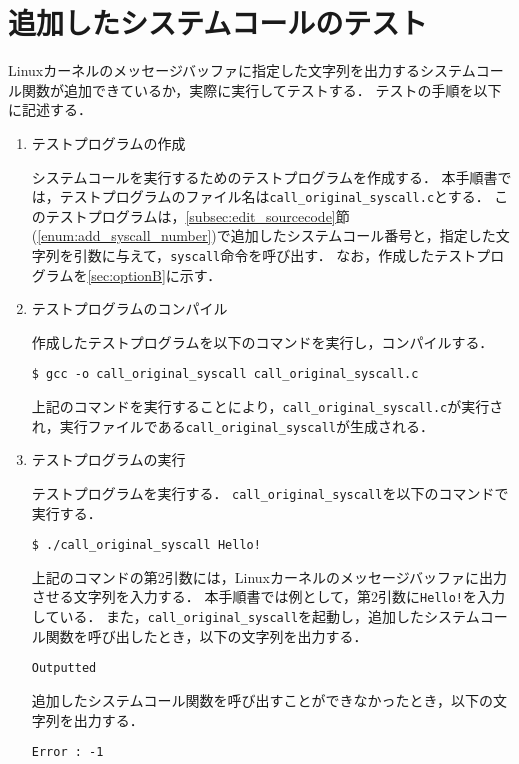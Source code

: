 \documentclass[12pt]{jsarticle}
\begin{document}
\section{追加したシステムコールのテスト}\label{sec:test}
Linuxカーネルのメッセージバッファに指定した文字列を出力するシステムコール関数が追加できているか，実際に実行してテストする．
テストの手順を以下に記述する．

\begin{enumerate}
  \item\label{enum:make_test_program} テストプログラムの作成

    システムコールを実行するためのテストプログラムを作成する．
    本手順書では，テストプログラムのファイル名は\verb|call_original_syscall.c|とする．
    このテストプログラムは，\ref{subsec:edit_sourcecode}節(\ref{enum:add_syscall_number})で追加したシステムコール番号と，指定した文字列を引数に与えて，\verb|syscall|命令を呼び出す．
    なお，作成したテストプログラムを\ref{sec:optionB}に示す．
    
  \item テストプログラムのコンパイル

    作成したテストプログラムを以下のコマンドを実行し，コンパイルする．

\begin{verbatim}
$ gcc -o call_original_syscall call_original_syscall.c
\end{verbatim}
上記のコマンドを実行することにより，\verb|call_original_syscall.c|が実行され，実行ファイルである\verb|call_original_syscall|が生成される．

\item\label{enum:jikkou} テストプログラムの実行

  テストプログラムを実行する．
  \verb|call_original_syscall|を以下のコマンドで実行する．
\begin{verbatim}
$ ./call_original_syscall Hello!
\end{verbatim}
上記のコマンドの第2引数には，Linuxカーネルのメッセージバッファに出力させる文字列を入力する．
本手順書では例として，第2引数に\verb|Hello!|を入力している．
また，\verb|call_original_syscall|を起動し，追加したシステムコール関数を呼び出したとき，以下の文字列を出力する．
\begin{verbatim}
Outputted
\end{verbatim}
追加したシステムコール関数を呼び出すことができなかったとき，以下の文字列を出力する．
\begin{verbatim}
Error : -1
\end{verbatim}


\end{enumerate}
\end{document}
